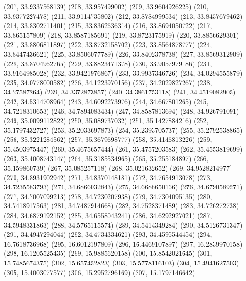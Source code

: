 {					(207, 33.9337568139)
					(208, 33.957499002)
					(209, 33.9604926225)
					(210, 33.9377227478)
					(211, 33.9114735802)
					(212, 33.8784999534)
					(213, 33.8437679462)
					(214, 33.8302711401)
					(215, 33.8362636314)
					(216, 33.8694050722)
					(217, 33.865157809)
					(218, 33.8587185691)
					(219, 33.8723175919)
					(220, 33.8856629301)
					(221, 33.8806811897)
					(222, 33.8732158702)
					(223, 33.8564878777)
					(224, 33.8447436621)
					(225, 33.8506077789)
					(226, 33.8402378738)
					(227, 33.8569312909)
					(228, 33.8704962765)
					(229, 33.8823471378)
					(230, 33.9057979186)
					(231, 33.9164985028)
					(232, 33.9421976867)
					(233, 33.9937346726)
					(234, 34.0294555879)
					(235, 34.0778000582)
					(236, 34.1223970156)
					(237, 34.2029827267)
					(238, 34.27587264)
					(239, 34.3372873857)
					(240, 34.3861753118)
					(241, 34.4519082905)
					(242, 34.5314708964)
					(243, 34.6092273976)
					(244, 34.667801265)
					(245, 34.7218310653)
					(246, 34.7894083434)
					(247, 34.8587813694)
					(248, 34.926791091)
					(249, 35.0099112822)
					(250, 35.089737032)
					(251, 35.1427884216)
					(252, 35.1797432727)
					(253, 35.2033697873)
					(254, 35.2393705737)
					(255, 35.2792538865)
					(256, 35.3221284562)
					(257, 35.3679698777)
					(258, 35.4146813226)
					(259, 35.4503975447)
					(260, 35.4675657444)
					(261, 35.4757203583)
					(262, 35.4553819699)
					(263, 35.4008743147)
					(264, 35.3185534965)
					(265, 35.255184897)
					(266, 35.159860739)
					(267, 35.085257118)
					(268, 35.021632652)
					(269, 34.9528214977)
					(270, 34.8931902942)
					(271, 34.8370148181)
					(272, 34.7654913078)
					(273, 34.7235583793)
					(274, 34.6866032843)
					(275, 34.6688650166)
					(276, 34.6790589271)
					(277, 34.7007099213)
					(278, 34.7230207938)
					(279, 34.7304095135)
					(280, 34.7418917563)
					(281, 34.7487914668)
					(282, 34.7528371489)
					(283, 34.726272738)
					(284, 34.6879192152)
					(285, 34.6558043241)
					(286, 34.6292927021)
					(287, 34.5948331863)
					(288, 34.5765115574)
					(289, 34.5414349284)
					(290, 34.5126731347)
					(291, 34.4947294044)
					(292, 34.4734334621)
					(293, 34.4595544454)
					(294, 16.7618736968)
					(295, 16.6012197809)
					(296, 16.4469107897)
					(297, 16.2839970158)
					(298, 16.1205525435)
					(299, 15.9885620158)
					(300, 15.8542021645)
					(301, 15.7485674375)
					(302, 15.657452823)
					(303, 15.5778116103)
					(304, 15.4941627503)
					(305, 15.4003077577)
					(306, 15.2952796169)
					(307, 15.1797146642)
}

